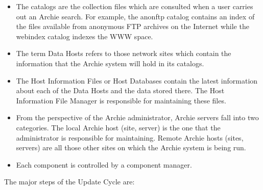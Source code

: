 \begin{itemize}

\item
The catalogs are the collection files which are consulted when a user
carries out an Archie search. For example, the anonftp catalog contains an
index of the files available from anonymous FTP archives on the Internet while
the webindex catalog indexes the WWW space.

\item
The term Data Hosts refers to those network sites which contain the
information that the Archie system will hold in its catalogs.

\item
The Host Information Files or Host Databases contain the latest information
about each of the Data Hosts and the data stored there. The Host Information
File Manager is responsible for maintaining these files.

\item
From the perspective of the Archie administrator, Archie servers fall into
two categories. The local Archie host (site, server) is the one that the
administrator is responsible for maintaining. Remote Archie hosts (sites,
servers) are all those other sites on which the Archie system is being run.

\item
Each component is controlled by a component manager.

\end{itemize}



The major steps of the Update Cycle are:


